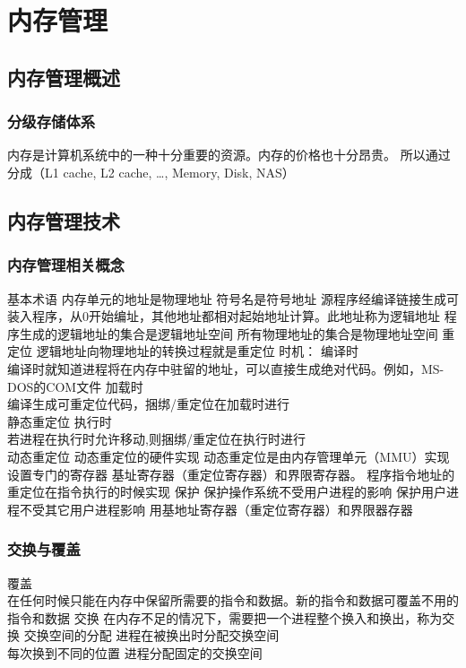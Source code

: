 \documentclass{ctexart}
\begin{document}
\section{内存管理}
\subsection{内存管理概述}
\subsubsection{分级存储体系}
内存是计算机系统中的一种十分重要的资源。内存的价格也十分昂贵。
所以通过分成（L1 cache, L2 cache, \dots, Memory, Disk, NAS）

\subsection{内存管理技术}
\subsubsection{内存管理相关概念}
\begin{outline}
    \1 基本术语
        \2 内存单元的地址是物理地址
        \2 符号名是符号地址
        \2 源程序经编译链接生成可装入程序，从0开始编址，其他地址都相对起始地址计算。此地址称为逻辑地址
        \2 程序生成的逻辑地址的集合是逻辑地址空间
        \2 所有物理地址的集合是物理地址空间
    \1 重定位
        \2 逻辑地址向物理地址的转换过程就是重定位
        \2 时机：
            \3 编译时 \\
            编译时就知道进程将在内存中驻留的地址，可以直接生成绝对代码。例如，MS-DOS的COM文件
            \3 加载时 \\
            编译生成可重定位代码，捆绑/重定位在加载时进行 \\
            静态重定位
            \3 执行时 \\
            若进程在执行时允许移动,则捆绑/重定位在执行时进行 \\
            动态重定位
    \1 动态重定位的硬件实现
        \2 动态重定位是由内存管理单元（MMU）实现
        \2 设置专门的寄存器
        \2 基址寄存器（重定位寄存器）和界限寄存器。
        \2 程序指令地址的重定位在指令执行的时候实现
    \1 保护
        \2 保护操作系统不受用户进程的影响
        \2 保护用户进程不受其它用户进程影响
        \2 用基地址寄存器（重定位寄存器）和界限器存器
\end{outline}
\subsubsection{交换与覆盖}
\begin{outline}
    \1 覆盖 \\
    在任何时候只能在内存中保留所需要的指令和数据。新的指令和数据可覆盖不用的指令和数据
    \1 交换
        \2 在内存不足的情况下，需要把一个进程整个换入和换出，称为交换
        \2 交换空间的分配
            \3 进程在被换出时分配交换空间 \\
            每次换到不同的位置
            \3 进程分配固定的交换空间
        \end{outline}
\end{document}
